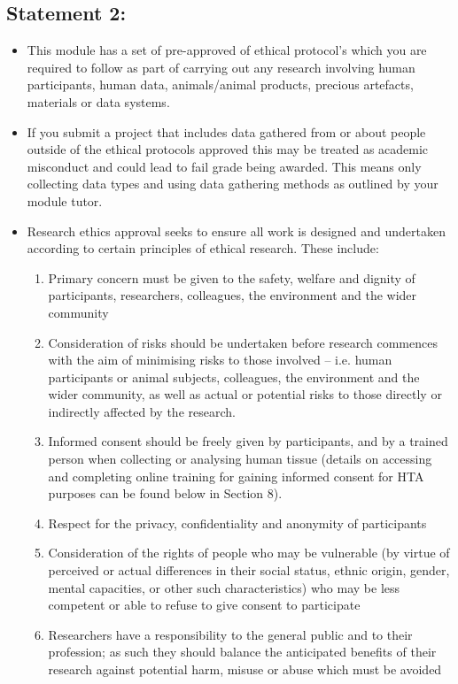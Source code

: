 \documentclass{MDXHandbook}
\begin{document}
\subsection*{Statement 2:}
\begin{itemize}
	\item 	This module has a set of pre-approved of ethical protocol’s which you are required to follow as part of carrying out any research involving human participants, human data, animals/animal products, precious artefacts, materials or data systems.
	\item If you submit a project that includes data gathered from or about people outside of the ethical protocols approved this may be treated as academic misconduct and could lead to fail grade being awarded. This means only collecting data types and using data gathering methods as outlined by your module tutor.
	\item Research ethics approval seeks to ensure all work is designed and undertaken according to certain principles of ethical research. These include: 
	\begin{enumerate}
		\item Primary concern must be given to the safety, welfare and dignity of participants, researchers, colleagues, the environment and the wider community 
		\item Consideration of risks should be undertaken before research commences with the aim of minimising risks to those involved – i.e. human participants or animal subjects, colleagues, the environment and the wider community, as well as actual or potential risks to those directly or indirectly affected by the research.
		\item Informed consent should be freely given by participants, and by a trained person when collecting or analysing human tissue (details on accessing and completing online training for gaining informed consent for HTA purposes can be found below in Section 8).
		\item Respect for the privacy, confidentiality and anonymity of participants 
		\item Consideration of the rights of people who may be vulnerable (by virtue of perceived or actual differences in their social status, ethnic origin, gender, mental capacities, or other such characteristics) who may be less competent or able to refuse to give consent to participate
		\item Researchers have a responsibility to the general public and to their profession; as such they should balance the anticipated benefits of their research against potential harm, misuse or abuse which must be avoided 

\end{enumerate}
\end{itemize}
\end{document}
